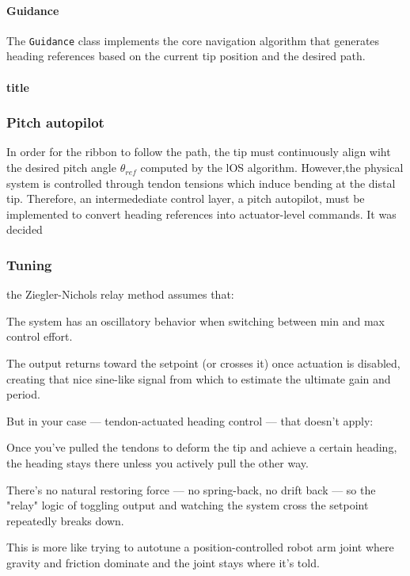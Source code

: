 \paragraph*{Guidance}
The \texttt{Guidance} class implements the core navigation algorithm that generates heading references based on the current tip position and the desired path.

\paragraph*{title}

\subsubsection{Pitch autopilot}
In order for the ribbon to follow the path, the tip must continuously align wiht the desired pitch angle \(\theta_{ref}\) computed by the lOS algorithm. However,the physical system is controlled through tendon tensions which induce bending at the distal tip. Therefore, an intermedediate control layer, a pitch autopilot, must be implemented to convert heading references into actuator-level commands.
\newline \newline
It was decided 

\subsubsection{Tuning}
the Ziegler-Nichols relay method assumes that:

The system has an oscillatory behavior when switching between min and max control effort.

The output returns toward the setpoint (or crosses it) once actuation is disabled, creating that nice sine-like signal from which to estimate the ultimate gain and period.

But in your case — tendon-actuated heading control — that doesn’t apply:

Once you've pulled the tendons to deform the tip and achieve a certain heading, the heading stays there unless you actively pull the other way.

There’s no natural restoring force — no spring-back, no drift back — so the "relay" logic of toggling output and watching the system cross the setpoint repeatedly breaks down.

This is more like trying to autotune a position-controlled robot arm joint where gravity and friction dominate and the joint stays where it's told.

